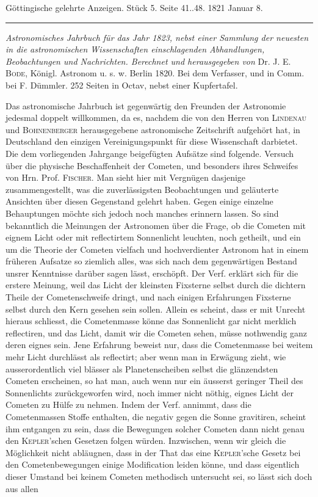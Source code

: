 \clearpage
{}
\hypertarget{native-630-lower}{}
\begin{center}\small Göttingische gelehrte Anzeigen. Stück 5. Seite 41..48. 1821 Januar 8.\\[3pt]\rule{.72\linewidth}{.3pt}\end{center}

\emph{Astronomisches Jahrbuch für das Jahr \textup{1823}, nebst einer Sammlung der neuesten in die astronomischen Wissenschaften einschlagenden Abhandlungen, Beobachtungen und Nachrichten. Berechnet und herausgegeben von} Dr. J. E. \textsc{Bode}, Königl. Astronom u. s. w. Berlin 1820. Bei dem Verfasser, und in Comm. bei F. Dümmler. 252 Seiten in Octav, nebst einer Kupfertafel.

Das astronomische Jahrbuch ist gegenwärtig den Freunden der Astronomie jedesmal doppelt willkommen, da es, nachdem die von den Herren von \textsc{Lindenau} und \textsc{Bohnenberger} herausgegebene astronomische Zeitschrift aufgehört hat, in Deutschland den einzigen Vereinigungspunkt für diese Wissenschaft darbietet. Die dem vorliegenden Jahrgange beigefügten Aufsätze sind folgende. Versuch über die physische Beschaffenheit der Cometen, und besonders ihres Schweifes von Hrn. Prof. \textsc{Fischer}. Man sieht hier mit Vergnügen dasjenige zusammengestellt, was die zuverlässigsten Beobachtungen und geläuterte Ansichten über diesen Gegenstand gelehrt haben. Gegen einige einzelne Behauptungen möchte sich  jedoch noch manches erinnern lassen. So sind bekanntlich die Meinungen der Astronomen über die Frage, ob die Cometen mit eignem Licht oder mit reflectirtem Sonnenlicht leuchten, noch getheilt, und ein um die Theorie der Cometen vielfach und hochverdienter Astronom hat in einem früheren Aufsatze so ziemlich alles, was sich nach dem gegenwärtigen Bestand unsrer Kenntnisse darüber sagen lässt, erschöpft. Der Verf. erklärt sich für die erstere Meinung, weil das Licht der kleinsten Fixsterne selbst durch die dichtern Theile der Cometenschweife dringt, und nach einigen Erfahrungen Fixsterne selbst durch den Kern gesehen sein sollen. Allein es scheint, dass er mit Unrecht hieraus schliesst, die Cometenmasse könne das Sonnenlicht gar nicht merklich reflectiren, und das Licht, damit wir die Cometen sehen, müsse nothwendig ganz deren eignes sein. Jene Erfahrung beweist nur, dass die Cometenmasse bei weitem mehr Licht durchlässt als reflectirt; aber wenn man in Erwägung zieht, wie ausserordentlich viel blässer als Planetenscheiben selbst die glänzendsten Cometen erscheinen, so hat man, auch wenn nur ein äusserst geringer Theil des Sonnenlichts zurückgeworfen wird, noch immer nicht nöthig, eignes Licht der Cometen zu Hülfe zu nehmen. Indem der Verf. annimmt, dass die Cometenmassen Stoffe enthalten, die negativ gegen die Sonne gravitiren, scheint ihm entgangen zu sein, dass die Bewegungen solcher Cometen dann nicht genau den \textsc{Kepler}'schen Gesetzen folgen würden. Inzwischen, wenn wir gleich die Möglichkeit nicht abläugnen, dass in der That das eine \textsc{Kepler}'sche Gesetz bei den Cometenbewegungen einige Modification leiden könne, und dass eigentlich dieser Umstand bei keinem Cometen methodisch untersucht sei, so lässt sich doch aus allen 